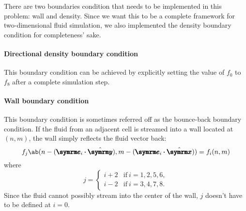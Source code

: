 There are two boundaries condition that needs to be implemented in this problem: wall and density. Since we want this to be a complete framework for two-dimensional fluid simulation, we also implemented the density boundary condition for completeness' sake.

\paragraph{Directional density boundary condition} This boundary condition can be achieved by explicitly setting the value of $f_0$ to $f_8$ after a complete simulation step.

\paragraph{Wall boundary condition} This boundary condition is sometimes referred off as the bounce-back boundary condition. If the fluid from an adjacent cell is streamed into a wall located at $(n, m)$, the wall simply reflects the fluid vector back:
\begin{equation}
	f_j\ab(n - (\vv{e}_i \vdot \yhat), m - (\vv{e}_i \vdot \xhat)) = f_i(n, m) \label{eq:wall-boundary-calculation}
\end{equation}
where
\begin{equation}
	j = \begin{cases}
		i + 2 & \textrm{if} ~ i = 1, 2, 5, 6, \\
		i - 2 & \textrm{if} ~ i = 3, 4, 7, 8.
	\end{cases} \label{eq:wall-boundary-calculation-relation}
\end{equation}
Since the fluid cannot possibly stream into the center of the wall, $j$ doesn't have to be defined at $i = 0$. \cite{adams-no-date}

